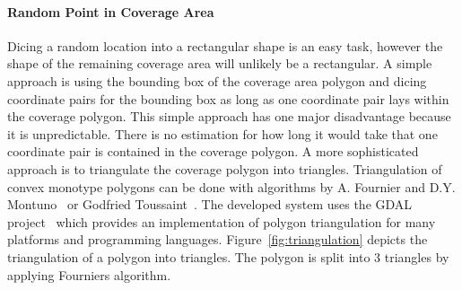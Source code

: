 \documentclass[master,english]{hgbthesis}
\begin{document}
\paragraph{Random Point in Coverage Area}
Dicing a random location into a rectangular shape is an easy task, however the shape of the remaining coverage area will unlikely be a rectangular. A simple approach is using the bounding box of the coverage area polygon and dicing coordinate pairs for the bounding box as long as one coordinate pair lays within the coverage polygon. This simple approach has one major disadvantage because it is unpredictable. There is no estimation for how long it would take that one coordinate pair is contained in the coverage polygon.
A more sophisticated approach is to triangulate the coverage polygon into triangles. Triangulation of convex monotype polygons can be done with algorithms by  A. Fournier and D.Y. Montuno~\cite{Fournier1984} or Godfried Toussaint~\cite{Toussaint1984}. The developed system uses the GDAL project~\cite{GDAL} which provides an implementation of polygon triangulation for many platforms and programming languages.
Figure~\ref{fig:triangulation} depicts the triangulation of a polygon into triangles. The polygon is split into 3 triangles by applying Fourniers algorithm.
\end{document}
